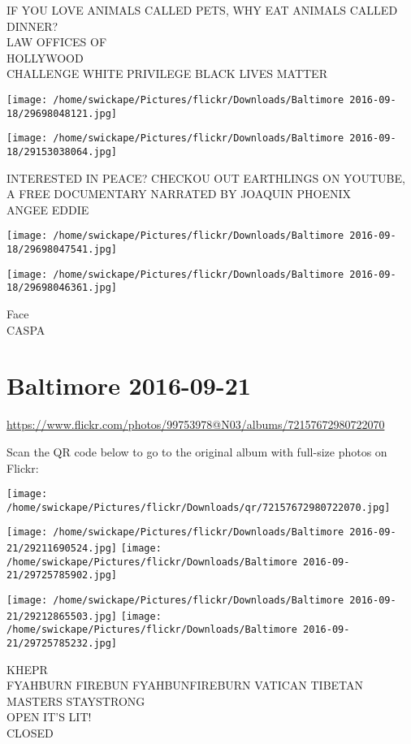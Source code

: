\documentclass[10pt,letterpaper]{article}
\begin{document}
IF YOU LOVE ANIMALS CALLED PETS, WHY EAT ANIMALS CALLED DINNER?\\
LAW OFFICES OF\\
HOLLYWOOD\\
CHALLENGE WHITE PRIVILEGE BLACK LIVES MATTER
\pagebreak

\texttt{[image: /home/swickape/Pictures/flickr/Downloads/Baltimore 2016-09-18/29698048121.jpg]}

\vspace{0.25in}
\texttt{[image: /home/swickape/Pictures/flickr/Downloads/Baltimore 2016-09-18/29153038064.jpg]}

INTERESTED IN PEACE?  CHECKOU OUT EARTHLINGS ON YOUTUBE, A FREE DOCUMENTARY NARRATED BY JOAQUIN PHOENIX\\
ANGEE EDDIE
\pagebreak

\texttt{[image: /home/swickape/Pictures/flickr/Downloads/Baltimore 2016-09-18/29698047541.jpg]}

\vspace{0.25in}
\texttt{[image: /home/swickape/Pictures/flickr/Downloads/Baltimore 2016-09-18/29698046361.jpg]}

Face\\
CASPA
\pagebreak

\section*{Baltimore 2016-09-21}

\url{https://www.flickr.com/photos/99753978@N03/albums/72157672980722070}

Scan the QR code below to go to the original album with full-size photos on Flickr:

\texttt{[image: /home/swickape/Pictures/flickr/Downloads/qr/72157672980722070.jpg]}
\pagebreak

\texttt{[image: /home/swickape/Pictures/flickr/Downloads/Baltimore 2016-09-21/29211690524.jpg]}
\texttt{[image: /home/swickape/Pictures/flickr/Downloads/Baltimore 2016-09-21/29725785902.jpg]}

\texttt{[image: /home/swickape/Pictures/flickr/Downloads/Baltimore 2016-09-21/29212865503.jpg]}
\texttt{[image: /home/swickape/Pictures/flickr/Downloads/Baltimore 2016-09-21/29725785232.jpg]}

KHEPR\\
FYAHBURN FIREBUN FYAHBUNFIREBURN VATICAN TIBETAN MASTERS STAYSTRONG\\
OPEN IT'S LIT!\\
CLOSED
\pagebreak
\end{document}
